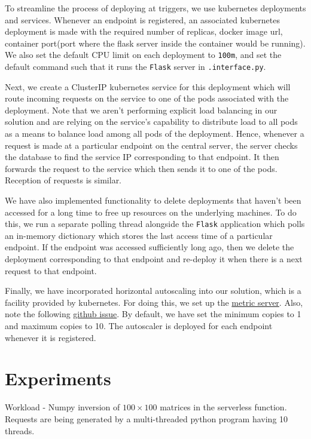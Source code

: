 \documentclass{article}
\begin{document}
To streamline the process of deploying at triggers, we use kubernetes deployments and services. Whenever an endpoint is registered, an associated kubernetes deployment is made with the required number of replicas, docker image url, container port(port where the flask server inside the container would be running). We also set the default CPU limit on each deployment to \texttt{100m}, and set the default command such that it runs the \texttt{Flask} server in \texttt{.interface.py}.

Next, we create a ClusterIP kubernetes service for this deployment which will route incoming requests on the service to one of the pods associated with the deployment. Note that we aren't performing explicit load balancing in our solution and are relying on the service's capability to distribute load to all pods as a means to balance load among all pods of the deployment. Hence, whenever a request is made at a particular endpoint on the central server, the server checks the database to find the service IP corresponding to that endpoint. It then forwards the request to the service which then sends it to one of the pods. Reception of requests is similar.

We have also implemented functionality to delete deployments that haven't been accessed for a long time to free up resources on the underlying machines. To do this, we run a separate polling thread alongside the \texttt{Flask} application which polls an in-memory dictionary which stores the last access time of a particular endpoint. If the endpoint was accessed sufficiently long ago, then we delete the deployment corresponding to that endpoint and re-deploy it when there is a next request to that endpoint.

Finally, we have incorporated horizontal autoscaling into our solution, which is a facility provided by kubernetes. For doing this, we set up the \href{https://github.com/kubernetes-sigs/metrics-server#deployment}{metric server}. Also, note the following \href{https://github.com/kubernetes-sigs/metrics-server/issues/525}{github issue}. By default, we have set the minimum copies to 1 and maximum copies to 10. The autoscaler is deployed for each endpoint whenever it is registered.

\section{Experiments}

Workload - Numpy inversion of $100 \times 100$ matrices in the serverless function.
Requests are being generated by a multi-threaded python program having 10 threads.
\end{document}
